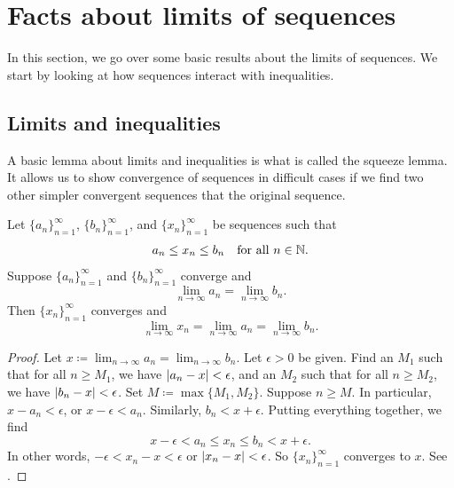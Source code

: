 
\sectionnewpage
\section{Facts about limits of sequences}
\label{sec:factslimsseqs}



In this section, we go over some basic results about the limits of
sequences.
We start by looking at how sequences interact with inequalities.

\subsection{Limits and inequalities}

A basic lemma about limits and inequalities is what is called the squeeze lemma.
It allows us to show convergence of sequences in difficult cases
if we find two other simpler convergent sequences that 
 the original sequence.

\begin{lemma} \label{squeeze:lemma}
Let $\{ a_n \}_{n=1}^\infty$, 
$\{ b_n \}_{n=1}^\infty$, and 
$\{ x_n \}_{n=1}^\infty$ be sequences such that
\begin{equation*}
a_n \leq x_n \leq b_n \quad \text{for all } n \in {\mathbb{N}}.
\end{equation*}
Suppose $\{ a_n \}_{n=1}^\infty$ and $\{ b_n \}_{n=1}^\infty$ converge and
\begin{equation*}
\lim_{n\to \infty} a_n
=
\lim_{n\to \infty} b_n .
\end{equation*}
Then $\{ x_n \}_{n=1}^\infty$ converges and
\begin{equation*}
\lim_{n\to \infty} x_n
=
\lim_{n\to \infty} a_n
=
\lim_{n\to \infty} b_n .
\end{equation*}
\end{lemma}

\begin{proof}
Let $x \coloneqq \lim_{n\to\infty} a_n = \lim_{n\to\infty} b_n$.
Let $\epsilon > 0$ be given.
Find an $M_1$ such that for all $n \geq M_1$, we have
$\lvert {a_n-x} \rvert < \epsilon$, and an $M_2$
such that for all $n \geq M_2$,
we have $\lvert {b_n-x} \rvert < \epsilon$.  Set $M \coloneqq \max \{M_1, M_2 \}$.
Suppose $n \geq M$.
In particular,
$x - a_n < \epsilon$, or 
$x - \epsilon < a_n$.  Similarly, $b_n < x + \epsilon$.
Putting everything together, we find
\begin{equation*}
x - \epsilon < a_n \leq x_n \leq b_n < x + \epsilon .
\end{equation*}
In other words, $-\epsilon < x_n-x < \epsilon$ or $\lvert {x_n-x} \rvert < \epsilon$.
So $\{x_n\}_{n=1}^\infty$ converges to $x$.
See .
\end{proof}

